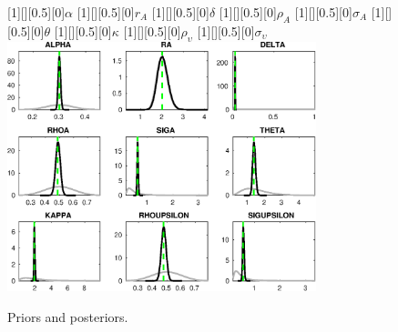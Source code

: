  
\begin{figure}[H]
[1][][0.5][0]{$ {\alpha} $}
[1][][0.5][0]{$ {r_{A}} $}
[1][][0.5][0]{$ {\delta} $}
[1][][0.5][0]{$ {\rho_A} $}
[1][][0.5][0]{$ {\sigma_A} $}
[1][][0.5][0]{$ {\theta} $}
[1][][0.5][0]{$ {\kappa} $}
[1][][0.5][0]{$ {\rho_\upsilon} $}
[1][][0.5][0]{$ {\sigma_\upsilon} $}
\centering
\includegraphics[width=0.80\textwidth]{KimModTheBuilder/Output/KimModTheBuilder_PriorsAndPosteriors1}
\caption{Priors and posteriors.}\label{Fig:PriorsAndPosteriors:1}
\end{figure}
 
